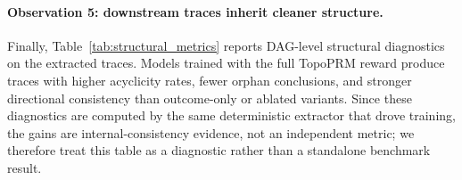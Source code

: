    
    
    \paragraph{Observation 5: downstream traces inherit cleaner structure.}
    Finally, Table~\ref{tab:structural_metrics} reports DAG-level structural diagnostics on the extracted traces. Models trained with the full TopoPRM reward produce traces with higher acyclicity rates, fewer orphan conclusions, and stronger directional consistency than outcome-only or ablated variants. Since these diagnostics are computed by the same deterministic extractor that drove training, the gains are internal-consistency evidence, not an independent metric; we therefore treat this table as a diagnostic rather than a standalone benchmark result.
    
    
    
    
    
